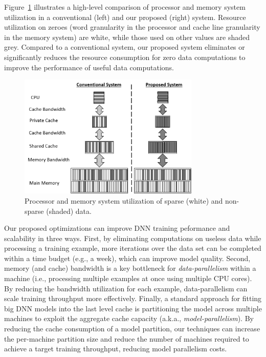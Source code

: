 Figure~\ref{fig:system-compare} illustrates a high-level comparison of processor and memory system utilization in a conventional (left) and our proposed (right) system.  Resource utilization on zeroes (word granularity in the processor and cache line granularity in the memory system) are white, while those used on other values are shaded grey. Compared to a conventional system, our proposed system eliminates or significantly reduces the resource consumption for zero data computations to improve the performance of useful data computations. 

\begin{figure}[!t]
\centering
\includegraphics[width=3.4in]{Figures/system-comparison.png}
\caption{Processor and memory system utilization of sparse (white) and non-sparse (shaded) data.}
\label{fig:system-compare}
\end{figure}

Our proposed optimizations can improve DNN training peformance and scalability in three ways.  First, by eliminating computations on useless data while processing a training example, more iterations over the data set can be completed within a time budget (e.g., a week), which can improve model quality.  Second,  memory (and cache) bandwidth is a key bottleneck for {\it data-parallelism} within a machine (i.e., processing multiple examples at once using multiple CPU cores). By reducing the bandwidth utilization for each example, data-parallelism can scale training throughput more effectively.  Finally, a standard approach for fitting big DNN models into the last level cache is partitioning the model across multiple machines to exploit the aggregate cache capacity (a.k.a., {\it model-parallelism}). By reducing the cache consumption of a model partition, our techniques can increase the per-machine partition size and reduce the number of machines required to achieve a target training throughput, reducing model parallelism costs. 

